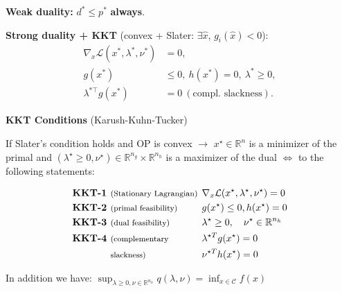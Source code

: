 \textbf{Weak duality:} \(d^*\le p^*\) \textbf{always}.

\textbf{Strong duality + KKT} (convex + Slater: \(\exists\hat x\),
\(g_i(\hat x)<0\)):
\begin{align*}
  \nabla_x\mathcal L(x^*,\lambda^*,\nu^*)&=0,\\
  g(x^*)&\le0,\ h(x^*)=0,\ \lambda^*\ge0,\\
  \lambda^{*\top}g(x^*)&=0\ (\text{compl.\ slackness}).
\end{align*}

\begin{sstTitleBox}[BrickRed]{\textbf{\large
      KKT  Conditions
    }
  \normalsize(Karush-Kuhn-Tucker)}
  \begin{sstOnlyFrame}[BrickRed]
    If Slater's condition holds and
    OP is convex
    $\rightarrow$
    $x^\star \in \mathbb{R}^{n}$ is a minimizer of the primal
    and
    $(\lambda^\star\ge0,\nu^\star)\in\mathbb{R}^{n_g}\times\mathbb{R}^{n_h}$
    is a maximizer of the dual $\Leftrightarrow$
    to the following statements:
  \end{sstOnlyFrame}
  \begin{sstFullFrame}[BrickRed]
    \vspace{-3mm}
    \color{white}
    \small
    \[
      \begin{aligned}
        \textbf{KKT-1 } & \text{\footnotesize (Stationary
        Lagrangian)} \hspace{-2mm} &  &
        \nabla_x\mathcal{L}(x^\star,\lambda^\star,\nu^\star)  =  0
        \\
        \textbf{KKT-2 } &
        \text{\footnotesize (primal feasibility)}
        && g(x^\star)\le0, h(x^\star)= 0
        \\
        \textbf{KKT-3 } & \text{\footnotesize (dual feasibility)}
        &  & \lambda^\star  \ge 0,\quad \nu^\star \in \mathbb{R}^{n_h}
        \\
        \textbf{KKT-4 } & \text{\footnotesize (complementary}
          &  & \lambda^{\star T} g(x^\star)
          =                          0
          \\
        & \text{\footnotesize slackness)}
        &  & \nu^{\star T} h(x^\star)                              =  0
    \end{aligned}\]
    \vspace{-4mm}
  \end{sstFullFrame}
  \begin{sstOnlyFrame}[BrickRed]
    In addition we have:
    $\sup_{\lambda\ge0,\nu\in\mathbb{R}^{n_h}}q(\lambda,\nu)=\inf_{x\in\mathcal{C}}f(x)$
  \end{sstOnlyFrame}
\end{sstTitleBox}

